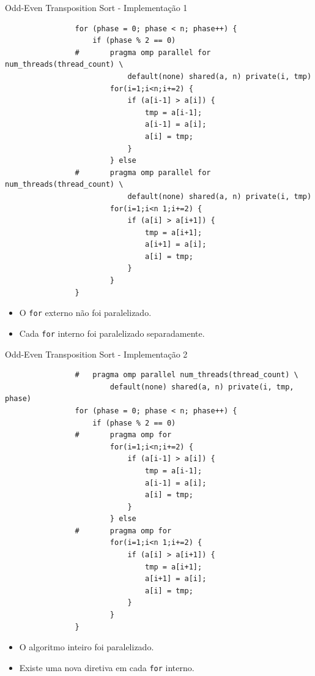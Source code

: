 	\begin{frame}[fragile]{Odd-Even Transposition Sort - Implementação 1}
		\begin{multicols}{2}
			\begin{verbatim}
				for (phase = 0; phase < n; phase++) { 
					if (phase % 2 == 0)
				#		pragma omp parallel for num_threads(thread_count) \ 
							default(none) shared(a, n) private(i, tmp)
						for(i=1;i<n;i+=2) { 
							if (a[i-1] > a[i]) {
								tmp = a[i-1]; 
								a[i-1] = a[i]; 
								a[i] = tmp;
							} 
						} else
				#		pragma omp parallel for num_threads(thread_count) \
							default(none) shared(a, n) private(i, tmp) 
						for(i=1;i<n 1;i+=2) {
							if (a[i] > a[i+1]) { 
								tmp = a[i+1]; 
								a[i+1] = a[i]; 
								a[i] = tmp;
							}
						}
				} 
			\end{verbatim}
		\columnbreak
			\begin{itemize}
				\setlength\itemsep{3em}
				\item O {\tt for} externo não foi paralelizado.
				\item Cada {\tt for} interno foi paralelizado separadamente.
			\end{itemize}
		\end{multicols}
\end{frame}


	\begin{frame}[fragile]{Odd-Even Transposition Sort - Implementação 2}
		\begin{multicols}{2}
			\begin{verbatim}
				# 	pragma omp parallel num_threads(thread_count) \ 
						default(none) shared(a, n) private(i, tmp, phase)
				for (phase = 0; phase < n; phase++) { 
					if (phase % 2 == 0)
				#		pragma omp for
						for(i=1;i<n;i+=2) { 
							if (a[i-1] > a[i]) {
								tmp = a[i-1]; 
								a[i-1] = a[i]; 
								a[i] = tmp;
							} 
						} else
				#		pragma omp for
						for(i=1;i<n 1;i+=2) {
							if (a[i] > a[i+1]) { 
								tmp = a[i+1]; 
								a[i+1] = a[i]; 
								a[i] = tmp;
							}
						}
				} 
			\end{verbatim}
		\columnbreak
			\begin{itemize}
				\setlength\itemsep{3em}
				\item O algoritmo inteiro foi paralelizado.
				\item Existe uma nova diretiva em cada {\tt for} interno.
			\end{itemize}
		\end{multicols}
\end{frame}



